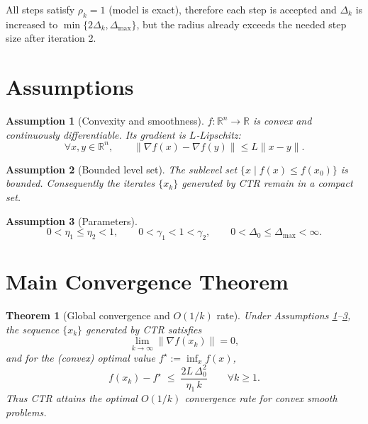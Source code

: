\documentclass{article}
\newtheorem{theorem}{Theorem}
\newtheorem{assumption}{Assumption}
\begin{document}
All steps satisfy $\rho_k=1$ (model is exact), therefore each step is accepted and $\Delta_k$ is increased to $\min\{2\Delta_k,\Delta_{\max}\}$, but the radius already exceeds the needed step size after iteration 2.

\section*{Assumptions}
\begin{assumption}[Convexity and smoothness]\label{as:convex}
$f:\mathbb{R}^n\to\mathbb{R}$ is convex and continuously differentiable. Its gradient is $L$‑Lipschitz:
\[
\forall x,y\in\mathbb{R}^n,\qquad 
\|\nabla f(x)-\nabla f(y)\|\le L\|x-y\|.
\]
\end{assumption}
\begin{assumption}[Bounded level set]\label{as:bounded}
The sublevel set $\{x\mid f(x)\le f(x_0)\}$ is bounded. Consequently the iterates $\{x_k\}$ generated by CTR remain in a compact set.
\end{assumption}
\begin{assumption}[Parameters]\label{as:params}
\[
0<\eta_1\le\eta_2<1,\qquad
0<\gamma_1<1<\gamma_2,\qquad
0<\Delta_0\le\Delta_{\max}<\infty .
\]
\end{assumption}

\section*{Main Convergence Theorem}
\begin{theorem}[Global convergence and $O(1/k)$ rate]\label{thm:main}
Under Assumptions \ref{as:convex}–\ref{as:params}, the sequence $\{x_k\}$ generated by CTR satisfies
\[
\lim_{k\to\infty}\|\nabla f(x_k)\|=0,
\]
and for the (convex) optimal value $f^\star:=\inf_x f(x)$,
\[
f(x_k)-f^\star \;\le\; \frac{2L\,\Delta_0^2}{\eta_1\,k}\qquad\forall k\ge1 .
\]
Thus CTR attains the optimal $O(1/k)$ convergence rate for convex smooth problems.
\end{theorem}
\end{document}
